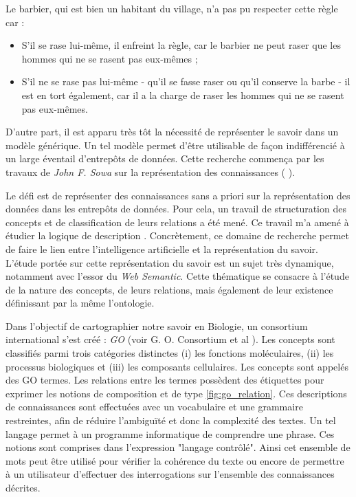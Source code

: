 \begin{refsegment}
{    Le barbier, qui est bien un habitant du village, n'a pas pu respecter cette règle car :
    \begin{itemize}
        \item S'il se rase lui-même, il enfreint la règle, car le barbier ne peut raser que les hommes qui ne se rasent pas eux-mêmes ;
        \item S'il ne se rase pas lui-même - qu'il se fasse raser ou qu'il conserve la barbe - il est en tort également, car il a la charge de raser les hommes qui ne se rasent pas eux-mêmes.
    \end{itemize}
}

D'autre part, il est apparu très tôt la nécessité de représenter le savoir dans un modèle générique. Un tel modèle permet d'être utilisable de façon indifférencié à un large éventail d'entrepôts de données. Cette recherche commença par les travaux de \textit{John F. Sowa} sur la représentation des connaissances ( \citeyear{sowa92,sowa99}).

Le défi est de représenter des connaissances sans a priori sur la représentation des données dans les entrepôts de données. Pour cela, un travail de structuration des concepts et de classification de leurs relations a été mené. Ce travail m'a amené à étudier la logique de description \cite{baader2003description}. Concrètement, ce domaine de recherche permet de faire le lien entre l'intelligence artificielle et la représentation du savoir. L'étude portée sur cette représentation du savoir est un sujet très dynamique, notamment avec l'essor du \textit{Web Semantic}. Cette thématique se consacre à l'étude de la nature des concepts, de leurs relations, mais également de leur existence définissant par la même l'ontologie.

Dans l'objectif de cartographier notre savoir en Biologie, un consortium international s'est créé : \textit{\gls{GO}} (voir G. O. Consortium
et al \citeyear{go2001,go2004}). Les concepts sont classifiés parmi trois catégories distinctes (i) les fonctions moléculaires, (ii) les processus biologiques et (iii) les composants cellulaires. Les concepts sont appelés des GO termes. Les relations entre les termes possèdent des étiquettes pour exprimer les notions de composition et de type \cref{fig:go_relation}. Ces descriptions de connaissances sont effectuées avec un vocabulaire et une grammaire restreintes, afin de réduire l'ambiguïté et donc la complexité des textes. Un tel langage permet à un programme informatique de comprendre une phrase. Ces  notions sont comprises dans l'expression "langage contrôlé". Ainsi cet ensemble de mots peut être utilisé pour vérifier la cohérence du texte ou encore de permettre à un utilisateur d'effectuer des interrogations sur l'ensemble des connaissances décrites.


\end{refsegment}
